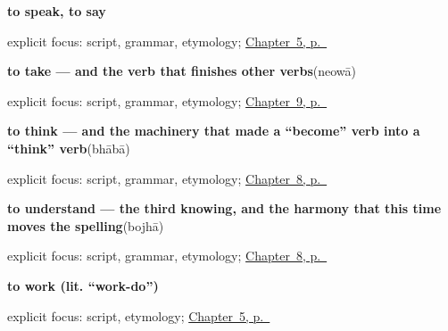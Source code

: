 \noindent\begin{minipage}[t]{\linewidth}
\raggedright
\textbf{to speak, to say}\enspace\emph{}\par
\footnotesize explicit focus: script, grammar, etymology; \hyperref[ch:first-verbs]{Chapter~5, p.~\pageref*{ch:first-verbs}}
\end{minipage}\par\smallskip

\noindent\begin{minipage}[t]{\linewidth}
\raggedright
\textbf{to take — and the verb that finishes other verbs}\enspace\emph{}\enspace(neowā)\par
\footnotesize explicit focus: script, grammar, etymology; \hyperref[ch:bn-conjunct-verbs]{Chapter~9, p.~\pageref*{ch:bn-conjunct-verbs}}
\end{minipage}\par\smallskip

\noindent\begin{minipage}[t]{\linewidth}
\raggedright
\textbf{to think — and the machinery that made a \textquotedblleft{}become\textquotedblright{} verb into a \textquotedblleft{}think\textquotedblright{} verb}\enspace\emph{}\enspace(bhābā)\par
\footnotesize explicit focus: script, grammar, etymology; \hyperref[ch:bn-mind-and-page]{Chapter~8, p.~\pageref*{ch:bn-mind-and-page}}
\end{minipage}\par\smallskip

\noindent\begin{minipage}[t]{\linewidth}
\raggedright
\textbf{to understand — the third knowing, and the harmony that this time moves the spelling}\enspace\emph{}\enspace(bojhā)\par
\footnotesize explicit focus: script, grammar, etymology; \hyperref[ch:bn-mind-and-page]{Chapter~8, p.~\pageref*{ch:bn-mind-and-page}}
\end{minipage}\par\smallskip

\noindent\begin{minipage}[t]{\linewidth}
\raggedright
\textbf{to work (lit. \textquotedblleft{}work-do\textquotedblright{})}\enspace\emph{ }\par
\footnotesize explicit focus: script, etymology; \hyperref[ch:first-verbs]{Chapter~5, p.~\pageref*{ch:first-verbs}}
\end{minipage}\par\smallskip

